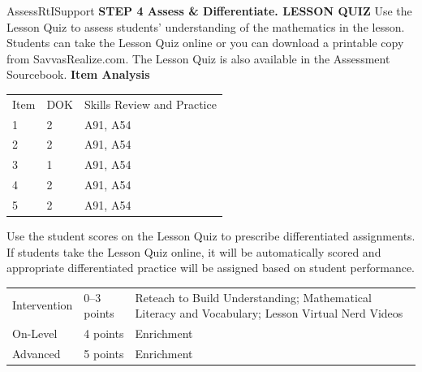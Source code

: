 \documentclass{article}
\newenvironment{te-addendum}[2]{}{}     %
\begin{document}
\begin{te-addendum}{Assess}{RtISupport}
\textbf{STEP 4 Assess & Differentiate. LESSON QUIZ}
Use the Lesson Quiz to assess students' understanding of the mathematics in the lesson.
Students can take the Lesson Quiz online or you can download a printable copy from SavvasRealize.com. The Lesson Quiz is also available in the Assessment Sourcebook.
\textbf{Item Analysis}
\begin{tabular}{lll}
Item & DOK & Skills Review and Practice \\
1 & 2 & A91, A54 \\
2 & 2 & A91, A54 \\
3 & 1 & A91, A54 \\
4 & 2 & A91, A54 \\
5 & 2 & A91, A54 \\
\end{tabular}
Use the student scores on the Lesson Quiz to prescribe differentiated assignments.
If students take the Lesson Quiz online, it will be automatically scored and appropriate differentiated practice will be assigned based on student performance.
\begin{tabular}{lll}
Intervention & 0--3 points & Reteach to Build Understanding; Mathematical Literacy and Vocabulary; Lesson Virtual Nerd Videos \\
On-Level & 4 points & Enrichment \\
Advanced & 5 points & Enrichment \\
\end{tabular}
\end{te-addendum}
\end{document}
